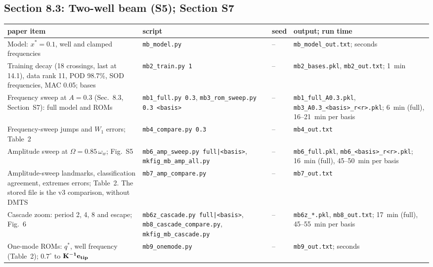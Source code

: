 \documentclass[10pt]{article}
\newcommand{\f}[1]{\texttt{#1}}
\begin{document}
\subsection*{Section 8.3: Two-well beam (S5); Section S7}
\begin{longtable}{L{0.31\textwidth}L{0.25\textwidth}L{0.08\textwidth}L{0.25\textwidth}}
\toprule
paper item & script & seed & output; run time\\ \midrule
Model: $x^*=0.1$, well and clamped frequencies & \f{mb\_\allowbreak{}model.py} & -- & \f{mb\_\allowbreak{}model\_\allowbreak{}out.txt}; seconds\\
Training decay (18 crossings, last at 14.1), data rank 11, POD 98.7\%, SOD frequencies, MAC 0.05; bases & \f{mb2\_\allowbreak{}train.py 1} & -- & \f{mb2\_\allowbreak{}bases.pkl}, \f{mb2\_\allowbreak{}out.txt}; 1~min\\
Frequency sweep at $A=0.3$ (Sec.~8.3, Section~S7): full model and ROMs & \f{mb1\_\allowbreak{}full.py 0.3}, \f{mb3\_\allowbreak{}rom\_\allowbreak{}sweep.py 0.3 <basis>} & -- & \f{mb1\_\allowbreak{}full\_\allowbreak{}A0.3.pkl}, \f{mb3\_\allowbreak{}A0.3\_\allowbreak{}<basis>\_\allowbreak{}r<r>.pkl}; 6~min (full), 16--21~min per basis\\
Frequency-sweep jumps and $W_1$ errors; Table~2 & \f{mb4\_\allowbreak{}compare.py 0.3} & -- & \f{mb4\_\allowbreak{}out.txt}\\
Amplitude sweep at $\Omega=0.85\,\omega_w$; Fig.~S5 & \f{mb6\_\allowbreak{}amp\_\allowbreak{}sweep.py full|<basis>}, \f{mkfig\_\allowbreak{}mb\_\allowbreak{}amp\_\allowbreak{}all.py} & -- & \f{mb6\_\allowbreak{}full.pkl}, \f{mb6\_\allowbreak{}<basis>\_\allowbreak{}r<r>.pkl}; 16~min (full), 45--50~min per basis\\
Amplitude-sweep landmarks, classification agreement, extremes errors; Table~2. The stored file is the v3 comparison, without DMTS & \f{mb7\_\allowbreak{}amp\_\allowbreak{}compare.py} & -- & \f{mb7\_\allowbreak{}out.txt}\\
Cascade zoom: period 2, 4, 8 and escape; Fig.~6 & \f{mb6z\_\allowbreak{}cascade.py full|<basis>}, \f{mb8\_\allowbreak{}cascade\_\allowbreak{}compare.py}, \f{mkfig\_\allowbreak{}mb\_\allowbreak{}cascade.py} & -- & \f{mb6z\_\allowbreak{}*.pkl}, \f{mb8\_\allowbreak{}out.txt}; 17~min (full), 45--55~min per basis\\
One-mode ROMs: $q^*$, well frequency (Table~2); $0.7^\circ$ to $\bf K^{-1}e_{tip}$ & \f{mb9\_\allowbreak{}onemode.py} & -- & \f{mb9\_\allowbreak{}out.txt}; seconds\\

\end{longtable}
\end{document}
